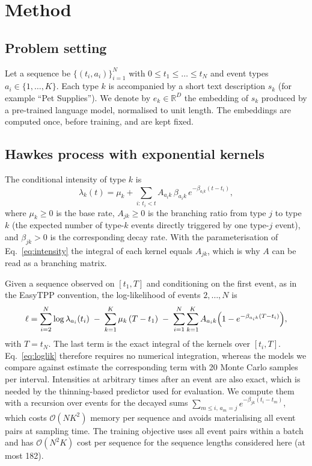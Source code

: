 \documentclass[preprint,12pt,authoryear]{elsarticle}
\begin{document}
\section{Method}
\label{sec:method}

\subsection{Problem setting}

Let a sequence be $\{(t_i,a_i)\}_{i=1}^{N}$ with $0\le t_1\le\dots\le t_N$ and event types $a_i\in\{1,\dots,K\}$. Each type $k$ is accompanied by a short text description $s_k$ (for example ``Pet Supplies''). We denote by $e_k\in\mathbb{R}^{D}$ the embedding of $s_k$ produced by a pre-trained language model, normalised to unit length. The embeddings are computed once, before training, and are kept fixed.

\subsection{Hawkes process with exponential kernels}

The conditional intensity of type $k$ is
\begin{equation}
\lambda_k(t)=\mu_k+\sum_{i:\,t_i<t}A_{a_i k}\,\beta_{a_i k}\,e^{-\beta_{a_i k}(t-t_i)},
\label{eq:intensity}
\end{equation}
where $\mu_k\ge0$ is the base rate, $A_{jk}\ge0$ is the branching ratio from type $j$ to type $k$ (the expected number of type-$k$ events directly triggered by one type-$j$ event), and $\beta_{jk}>0$ is the corresponding decay rate. With the parameterisation of Eq.~\eqref{eq:intensity} the integral of each kernel equals $A_{jk}$, which is why $A$ can be read as a branching matrix.

Given a sequence observed on $[t_1,T]$ and conditioning on the first event, as in the EasyTPP convention, the log-likelihood of events $2,\dots,N$ is
\begin{equation}
\ell=\sum_{i=2}^{N}\log\lambda_{a_i}(t_i)\;-\;\sum_{k=1}^{K}\mu_k\,(T-t_1)\;-\;\sum_{i=1}^{N}\sum_{k=1}^{K}A_{a_i k}\Bigl(1-e^{-\beta_{a_i k}(T-t_i)}\Bigr),
\label{eq:loglik}
\end{equation}
with $T=t_N$. The last term is the exact integral of the kernels over $[t_i,T]$. Eq.~\eqref{eq:loglik} therefore requires no numerical integration, whereas the models we compare against estimate the corresponding term with 20 Monte Carlo samples per interval. Intensities at arbitrary times after an event are also exact, which is needed by the thinning-based predictor used for evaluation. We compute them with a recursion over events for the decayed sums $\sum_{m\le i,\,a_m=j}e^{-\beta_{jk}(t_i-t_m)}$, which costs $\mathcal{O}(NK^2)$ memory per sequence and avoids materialising all event pairs at sampling time. The training objective uses all event pairs within a batch and has $\mathcal{O}(N^2K)$ cost per sequence for the sequence lengths considered here (at most 182).
\end{document}
